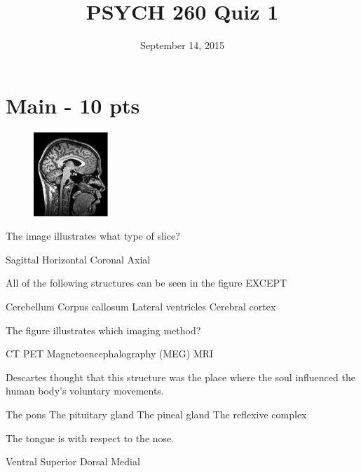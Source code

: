 \documentclass[answers]{exam}
\title{PSYCH 260 Quiz 1}
\author{}
\date{September 14, 2015}
\begin{document}
\maketitle

\section{Main - 10 pts}

\begin{questions}

\begin{figure}[h]
\includegraphics[width=0.25\textwidth]{images/brain.jpg}
\centering
\end{figure}

\question The image illustrates what type of slice?
\begin{choices}
 \correctchoice Sagittal
 \choice Horizontal
 \choice Coronal
 \choice Axial
\end{choices}

\question All of the following structures can be seen in the figure EXCEPT
\begin{choices}
\choice Cerebellum
\choice Corpus callosum
\correctchoice Lateral ventricles
\choice Cerebral cortex
\end{choices}

\question The figure illustrates which imaging method?
\begin{choices}
\choice CT
\choice PET
\choice Magnetoencephalography (MEG)
\correctchoice MRI
\end{choices}

\newpage

\question Descartes thought that this structure was the place where the soul influenced the human body's voluntary movements.
\begin{choices}
\choice The pons
\choice The pituitary gland
\correctchoice The pineal gland
\choice The reflexive complex
\end{choices}

\question The tongue is \fillin with respect to the nose.
\begin{choices}
\correctchoice Ventral
\choice Superior
\choice Dorsal
\choice Medial
\end{choices}


\end{questions}
\end{document}
